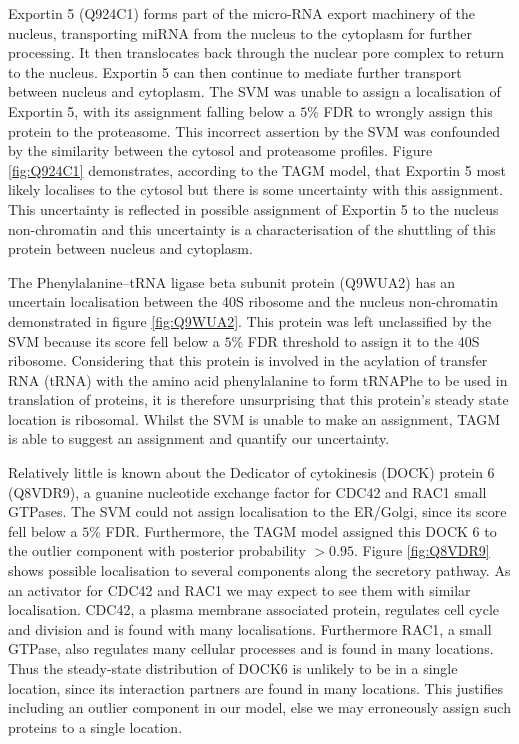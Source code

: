 \documentclass[12pt,english]{article}
\begin{document}
\bigskip
Exportin 5 (Q924C1) forms part of the micro-RNA export machinery of the nucleus, transporting miRNA from the nucleus to the cytoplasm for further processing.
It then translocates back through the nuclear pore complex to return to the nucleus.
Exportin 5 can then continue to mediate further transport between nucleus and cytoplasm.
The SVM was unable to assign a localisation of Exportin 5, with its assignment falling below
a $5\%$ FDR to wrongly assign this protein to the proteasome. This incorrect assertion by the SVM
was confounded by the similarity between the cytosol and proteasome profiles.
Figure \ref{fig:Q924C1} demonstrates, according to the TAGM model, that Exportin 5 most
likely localises to the cytosol but there is some uncertainty with this assignment.
This uncertainty is reflected in possible assignment of Exportin 5 to the nucleus non-chromatin
and this uncertainty is a characterisation of the shuttling of this protein between
nucleus and cytoplasm.

The Phenylalanine--tRNA ligase beta subunit protein (Q9WUA2)
has an uncertain localisation between the 40S ribosome and the nucleus non-chromatin
demonstrated in figure \ref{fig:Q9WUA2}. This protein was left
unclassified by the SVM because its score fell below a $5\%$
FDR threshold to assign it to the 40S ribosome. Considering that this protein is involved in
the acylation of transfer RNA (tRNA) with the amino acid phenylalanine to form tRNAPhe
to be used in translation of proteins,
it is therefore unsurprising that this protein's steady state location is ribosomal.
Whilst the SVM is unable to make an assignment, TAGM is able to suggest an assignment
and quantify our uncertainty.

Relatively little is known about the Dedicator of cytokinesis (DOCK) protein 6 (Q8VDR9),
a guanine nucleotide exchange factor for CDC42 and RAC1 small GTPases. The SVM could not
assign localisation to the ER/Golgi, since its score fell below a $5\%$ FDR. Furthermore,
the TAGM model assigned this DOCK 6 to the outlier component with posterior probability $>0.95$.
Figure \ref{fig:Q8VDR9} shows possible localisation to several components along the
secretory pathway. As an activator for CDC42 and RAC1 we may expect to see them
with similar localisation. CDC42, a plasma membrane associated protein, regulates
cell cycle and division and is found with many localisations. Furthermore RAC1, a small
GTPase, also regulates many cellular processes and is found in many locations. Thus
the steady-state distribution of DOCK6 is unlikely to be in a single location, since
its interaction partners are found in many locations. This justifies including
an outlier component in our model, else we may erroneously assign such proteins
to a single location.
\end{document}
